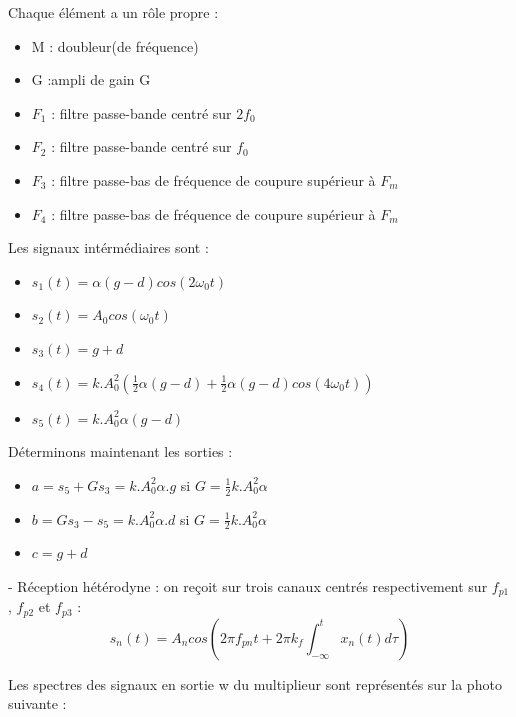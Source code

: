 \documentclass{article}
\begin{document}
 	Chaque élément a un rôle propre :\\
 	\begin{itemize}
 	\item M : doubleur(de fréquence)
 	\item G :ampli de gain G
 	\item $F_1$ : filtre passe-bande centré sur $2f_0$
 	\item $F_2$ : filtre passe-bande centré sur $f_0$
 	\item $F_3$ : filtre passe-bas de fréquence de coupure supérieur à $F_m$
 	\item $F_4$ : filtre passe-bas de fréquence de coupure supérieur à $F_m$
 	\end{itemize}
\bigbreak 	
 	
 	Les signaux intérmédiaires sont :\\
 	\begin{itemize}
 	\item $s_1(t) = \alpha (g-d)cos(2\omega_0t)$
 	\item $s_2(t) = A_0 cos(\omega_0t)$
 	\item $s_3(t) = g + d$
 	\item $s_4(t) = k.A_0^2(\frac{1}{2}\alpha (g-d) + \frac{1}{2}\alpha (g-d) cos(4\omega_0t))$
 	\item $s_5(t) = k.A_0^2 \alpha (g-d)$
 	\end{itemize}
\bigbreak 	
 	
 	Déterminons maintenant les sorties :\\
 	\begin{itemize}
 	\item $a = s_5 + G s_3 = k.A_0^2 \alpha.g$ si $G =  \frac{1}{2}k.A_0^2 \alpha$
 	\item $b = G s_3 - s_5 = k.A_0^2 \alpha.d$ si $G =  \frac{1}{2}k.A_0^2 \alpha$
 	\item $c = g+d$
 	\end{itemize}
 	\bigbreak
 	
 	- Réception hétérodyne : on reçoit sur trois canaux centrés respectivement sur $f_{p1}$, $f_{p2}$ et $f_{p3}$ :
 	\[s_n(t) = A_ncos(2\pi f_{pn}t + 2\pi k_f \int_{-\infty}^{t}x_n(t) d\tau)\]
 	
 	Les spectres des signaux en sortie w du multiplieur sont représentés sur la photo suivante :
 	\begin{center}
	\end{center}
	
\end{document}
